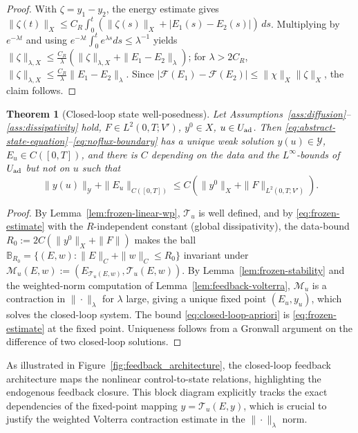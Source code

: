 \documentclass[pdflatex,sn-mathphys-num]{sn-jnl}
\theoremstyle{plain}
\newtheorem{theorem}{Theorem}[section]
\theoremstyle{definition}
\theoremstyle{remark}
\begin{document}
\begin{proof}
With $\zeta=y_1-y_2$, the energy estimate gives
$\|\zeta(t)\|_X\le C_R\int_0^t(\|\zeta(s)\|_X+|E_1(s)-E_2(s)|)\,ds$.
Multiplying by $e^{-\lambda t}$ and using
$e^{-\lambda t}\int_0^t e^{\lambda s}ds\le\lambda^{-1}$ yields
$\|\zeta\|_{\lambda,X}\le\frac{C_R}{\lambda}(\|\zeta\|_{\lambda,X}+\|E_1-E_2\|_\lambda)$;
for $\lambda>2C_R$, $\|\zeta\|_{\lambda,X}\le\frac{C_R}{\lambda}\|E_1-E_2\|_\lambda$.
Since $|\mathcal F(E_1)-\mathcal F(E_2)|\le\|\chi\|_X\|\zeta\|_X$, the claim
follows.
\end{proof}

\begin{theorem}[Closed-loop state well-posedness]
\label{thm:closed-loop-state-wp}
Let Assumptions~\ref{ass:diffusion}--\ref{ass:dissipativity} hold,
$F\in L^2(0,T;V')$, $y^0\in X$, $u\in U_{\rm ad}$. Then
\eqref{eq:abstract-state-equation}--\eqref{eq:noflux-boundary} has a unique
weak solution $y(u)\in\mathcal Y$, $E_u\in C([0,T])$, and there is $C$ depending
on the data and the $L^\infty$-bounds of $U_{\rm ad}$ but not on $u$ such that
\begin{equation}
\label{eq:closed-loop-apriori}
\|y(u)\|_{\mathcal Y}
+
\|E_u\|_{C([0,T])}
\le
C
\left(
\|y^0\|_X+\|F\|_{L^2(0,T;V')}
\right).
\end{equation}
\end{theorem}

\begin{proof}
By Lemma~\ref{lem:frozen-linear-wp}, $\mathscr T_u$ is well defined, and by
\eqref{eq:frozen-estimate} with the $R$-independent constant (global
dissipativity), the data-bound $R_0:=2C(\|y^0\|_X+\|F\|)$ makes the ball
$\mathbb B_{R_0}=\{(E,w):\|E\|_C+\|w\|_C\le R_0\}$ invariant under
$\mathscr M_u(E,w):=(E_{\mathscr T_u(E,w)},\mathscr T_u(E,w))$. 
By Lemma~\ref{lem:frozen-stability} and the weighted-norm computation of
Lemma~\ref{lem:feedback-volterra}, $\mathscr M_u$ is a contraction in
$\|\cdot\|_\lambda$ for $\lambda$ large, giving a unique fixed point
$(E_u,y_u)$, which solves the closed-loop system. The bound
\eqref{eq:closed-loop-apriori} is \eqref{eq:frozen-estimate} at the fixed
point. Uniqueness follows from a Gronwall argument on the difference of two
closed-loop solutions.
\end{proof}

As illustrated in Figure~\ref{fig:feedback_architecture}, the closed-loop feedback architecture maps the nonlinear control-to-state relations, highlighting the endogenous feedback closure. This block diagram explicitly tracks the exact dependencies of the fixed-point mapping $y = \mathscr{T}_u(E, y)$, which is crucial to justify the weighted Volterra contraction estimate in the $\|\cdot\|_\lambda$ norm.
\end{document}
